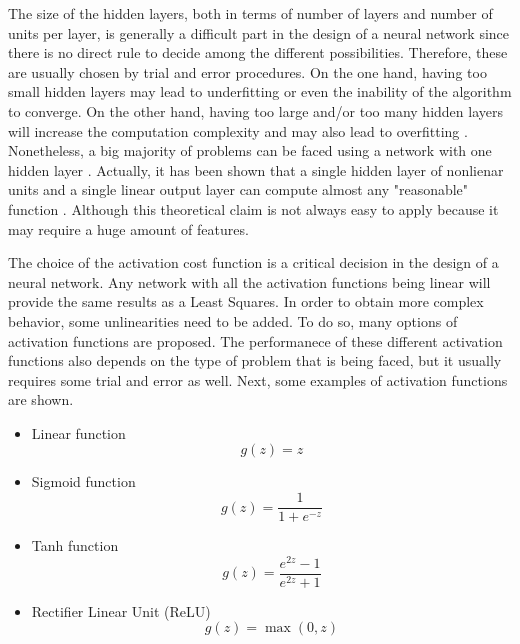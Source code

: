 \documentclass[a4paper, report, oneside, UKenglish]{memoir}
\begin{document}
The size of the hidden layers, both in terms of number of layers and number of units per layer, is generally a difficult part in the design of a neural network since there is no direct rule to decide among the different possibilities. Therefore, these are usually chosen by trial and error procedures. On the one hand, having too small hidden layers may lead to underfitting or even the inability of the algorithm to converge. On the other hand, having too large and/or too many hidden layers will increase the computation complexity and may also lead to overfitting \cite{aggarwal_neural_2018}. Nonetheless, a big majority of problems can be faced using a network with one hidden layer \cite{aggarwal_neural_2018}. Actually, it has been shown that a single hidden layer of nonlienar units and a single linear output layer can compute almost any "reasonable" function \cite{hornik_multilayer_1989}. Although this theoretical claim is not always easy to apply because it may require a huge amount of features.

The choice of the activation cost function is a critical decision in the design of a neural network. Any network with all the activation functions being linear will provide the same results as a Least Squares. In order to obtain more complex behavior, some unlinearities need to be added. To do so, many options of activation functions are proposed. The performanece of these different activation functions also depends on the type of problem that is being faced, but it usually requires some trial and error as well. Next, some examples of activation functions are shown.

\begin{itemize}
    \item Linear function
    \begin{equation}\label{eq:act_linear}
        g(z) = z
    \end{equation}
    \item Sigmoid function
    \begin{equation}\label{eq:act_sigmoid}
        g(z) = \frac{1}{1+e^{-z}}
    \end{equation}
    \item Tanh function
    \begin{equation}\label{eq:act_tanh}
        g(z) = \frac{e^{2z} - 1}{e^{2z} + 1}
    \end{equation}
    \item Rectifier Linear Unit (ReLU)
    \begin{equation}\label{eq:act_relu}
        g(z) = \max(0, z)
    \end{equation}
\end{itemize}
\end{document}
